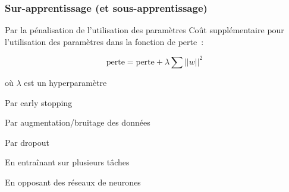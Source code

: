 \begin{frame}
  \frametitle{Sur-apprentissage (et sous-apprentissage)}
\end{frame}

\begin{frame}{Par la pénalisation de l'utilisation des paramètres}
  Coût supplémentaire pour l'utilisation des paramètres dans la fonction de perte~:

  \[
  \text{perte} = \text{perte} + \lambda\sum||w||^2
  \]

  où $\lambda$ est un hyperparamètre
\end{frame}

\begin{frame}{Par early stopping}
\end{frame}

\begin{frame}{Par augmentation/bruitage des données}
\end{frame}

\begin{frame}{Par dropout}
\end{frame}

\begin{frame}{En entraînant sur plusieurs tâches}
\end{frame}

\begin{frame}{En opposant des réseaux de neurones}
\end{frame}
